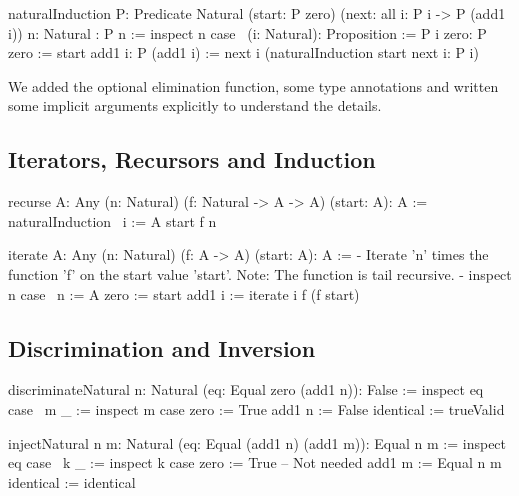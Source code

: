 \begin{alba}
    naturalInduction
        {P: Predicate Natural}
        (start: P zero)
        (next: all {i}: P i -> P (add1 i))
        {n: Natural}
        : P n
    :=
        inspect n case
            {\ (i: Natural): Proposition := P i}
            zero: P zero :=
                start
            add1 i: P (add1 i) :=
                next
                    {i}
                    (naturalInduction start next {i}: P i)
\end{alba}

We added the optional elimination function, some type annotations and written
some implicit arguments explicitly to understand the details.





\subsection{Iterators, Recursors and Induction}

\begin{alba}
    recurse {A: Any} (n: Natural) (f: Natural -> A -> A) (start: A): A :=
        naturalInduction
            {\ i := A}
            start
            f
            {n}

    iterate {A: Any} (n: Natural) (f: A -> A) (start: A): A :=
        {- Iterate 'n' times the function 'f' on the start value 'start'.
           Note: The function is tail recursive. -}
        inspect n case
            {\ n := A}
            zero :=
                start
            add1 i :=
                iterate i f (f start)
\end{alba}






\vskip 5mm
\subsection{Discrimination and Inversion}


\begin{alba}
    discriminateNatural {n: Natural} (eq: Equal zero (add1 n)): False :=
        inspect eq case
            { \ {m} _ :=
                inspect m case
                    zero :=
                        True
                    add1 n :=
                        False
            }
            identical :=
                trueValid


    injectNatural {n m: Natural} (eq: Equal (add1 n) (add1 m)): Equal n m :=
        inspect eq case
            { \ {k} _ :=
                inspect k case
                    zero :=
                        True  -- Not needed
                    add1 m :=
                        Equal n m}
            identical :=
                identical
\end{alba}







